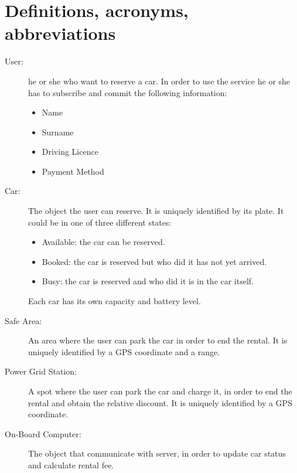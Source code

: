 \section{Definitions, acronyms, abbreviations}
\begin{description}
	\item [User:] he or she who want to reserve a car. In order to use the service he or she has to subscribe and commit the following information:
	\begin{itemize}
		\item Name
		\item Surname
		\item Driving Licence
		\item Payment Method
	\end{itemize}
	\item [Car:] The object the user can reserve. It is uniquely identified by its plate. It could be in one of three different states:
	\begin{itemize}
		\item Available: the car can be reserved.
		\item Booked: the car is reserved but who did it has not yet arrived.
		\item Busy: the car is reserved and who did it is in the car itself.
	\end{itemize}
	Each car has its own capacity and battery level.
	\item [Safe Area:] An area where the user can park the car in order to end the rental. It is uniquely identified by a GPS coordinate and a range.
	\item [Power Grid Station:] A spot where the user can park the car and charge it, in order to end the rental and obtain the relative discount. It is uniquely identified by a GPS coordinate.
	\item [On-Board Computer:] The object that communicate with server, in order to update car status and calculate rental fee.
	
\end{description}
